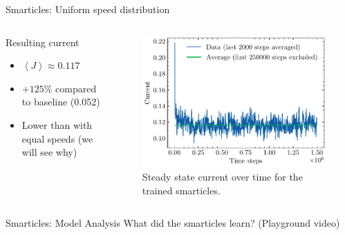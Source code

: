 \documentclass[10pt,xcolor=table, aspectratio=1610]{beamer}
\begin{document}
\begin{frame}{Smarticles: Uniform speed distribution}
  \begin{columns}
    \begin{block}{Resulting current}
      \begin{itemize}
        \item $\left\langle J \right\rangle \approx 0.117$
        \item $+125\%$ compared to baseline (0.052)
        \item Lower than with equal speeds (we will see why)
      \end{itemize}
    \end{block}
    \begin{figure}
        \includegraphics[width=\textwidth]{../Thesis/img/results/uniform_speeds.pdf}
        \caption*{Steady state current over time for the trained smarticles.}
      \end{figure}
  \end{columns}
\end{frame}

\begin{frame}{Smarticles: Model Analysis}
  What did the smarticles learn? (Playground video)
\end{frame}
\end{document}
